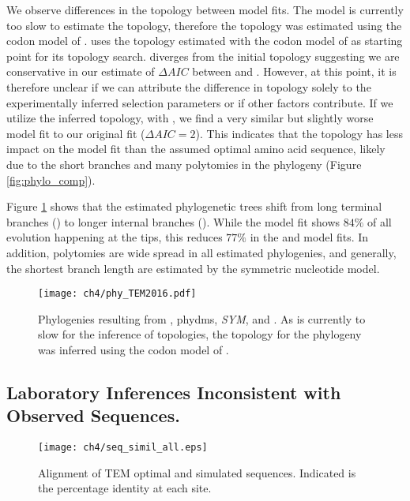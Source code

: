 We observe differences in the topology between model fits.
The \selac model is currently too slow to estimate the topology, therefore the topology was estimated using the codon model of \citet{KosiolEtAl07}.
\phydms uses the topology estimated with the codon model of \citet{KosiolEtAl07} as starting point for its topology search.
\phydms diverges from the initial topology suggesting we are conservative in our estimate of $\Delta AIC$ between \selac and \phydms.
However, at this point, it is therefore unclear if  we can attribute the difference in topology solely to the experimentally inferred selection parameters or if other factors contribute.
If we utilize the \phydms inferred topology, with \selac, we find a very similar but slightly worse model fit to our original \selac fit ($\Delta AIC = 2$).
This indicates that the topology has less impact on the model fit than the assumed optimal amino acid sequence, likely due to the short branches and many polytomies in the phylogeny (Figure \ref{fig:phylo_comp}).

Figure \ref{fig:phylo} shows that the estimated phylogenetic trees shift from long terminal branches (\selac) to longer internal branches (\phydms).
While the \selac model fit shows $84 \%$ of all evolution happening at the tips, this reduces $77 \%$ in the \phydms and \gy model fits.
In addition, polytomies are wide spread in all estimated phylogenies, and generally, the shortest branch length are estimated by the symmetric nucleotide model.


\singlespacing
\begin{figure}[H]
     \centering
	\texttt{[image: ch4/phy\_TEM2016.pdf]}
	\caption{Phylogenies resulting from \selac, phydms, \emph{SYM}, and \gy. As \selac is currently to slow for the inference of topologies, the topology for the \selac phylogeny was inferred using the codon model of \citet{KosiolEtAl07}.}
	\label{fig:phylo}
\end{figure}
\doublespacing
\clearpage


\subsection{Laboratory Inferences Inconsistent with Observed Sequences.}

\singlespacing
\begin{figure}
     \centering
	\texttt{[image: ch4/seq\_simil\_all.eps]}
	\caption{Alignment of TEM optimal and simulated sequences. Indicated is the percentage identity at each site.}
	\label{fig:sim_seqs_cons}
\end{figure}
\doublespacing

